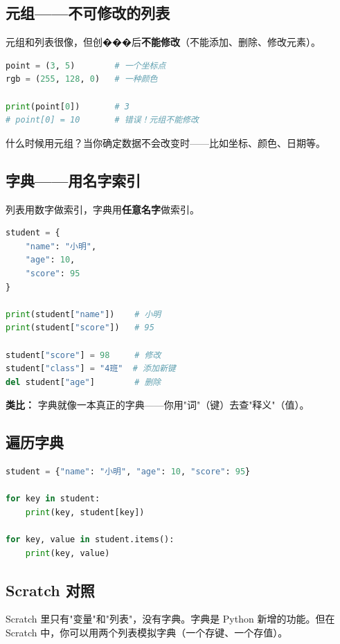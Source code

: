 \documentclass[a4paper,12pt]{ctexart}
\begin{document}
\subsection*{元组——不可修改的列表}

元组和列表很像，但创���后\textbf{不能修改}（不能添加、删除、修改元素）。

\begin{lstlisting}[language=Python]
point = (3, 5)        # 一个坐标点
rgb = (255, 128, 0)   # 一种颜色

print(point[0])       # 3
# point[0] = 10       # 错误！元组不能修改
\end{lstlisting}

什么时候用元组？当你确定数据不会改变时——比如坐标、颜色、日期等。

\subsection*{字典——用名字索引}

列表用数字做索引，字典用\textbf{任意名字}做索引。

\begin{lstlisting}[language=Python]
student = {
    "name": "小明",
    "age": 10,
    "score": 95
}

print(student["name"])    # 小明
print(student["score"])   # 95

student["score"] = 98     # 修改
student["class"] = "4班"  # 添加新键
del student["age"]        # 删除
\end{lstlisting}

\textbf{类比：} 字典就像一本真正的字典——你用"词"（键）去查"释义"（值）。

\subsection*{遍历字典}

\begin{lstlisting}[language=Python]
student = {"name": "小明", "age": 10, "score": 95}

for key in student:
    print(key, student[key])

for key, value in student.items():
    print(key, value)
\end{lstlisting}

\subsection*{Scratch 对照}

Scratch 里只有"变量"和"列表"，没有字典。字典是 Python 新增的功能。但在 Scratch 中，你可以用两个列表模拟字典（一个存键、一个存值）。
\end{document}
